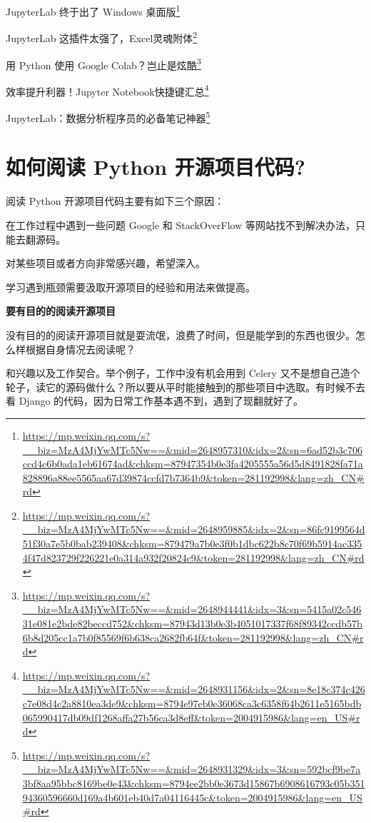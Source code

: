 \documentclass[]{ctexbook}
\renewcommand{\href}[2]{#2\footnote{\url{#1}}}
\begin{document}
\href{https://mp.weixin.qq.com/s?__biz=MzA4MjYwMTc5Nw==\&mid=2648957310\&idx=2\&sn=6ad52b3c706ccd4c6b0ada1eb61674ad\&chksm=87947354b0e3fa4205555a56d5d8491828fa71a828896a88ee5565aa67d39874ccfd7b7364b9\&token=281192998\&lang=zh_CN\#rd}{JupyterLab 终于出了 Windows 桌面版}

\href{https://mp.weixin.qq.com/s?__biz=MzA4MjYwMTc5Nw==\&mid=2648959885\&idx=2\&sn=86fc9199564d51f30a7e5b0bab239408\&chksm=879479a7b0e3f0b1dbc622b8c70f69b5914ac3354f47d823729f226221e0a314a932f20824c9\&token=281192998\&lang=zh_CN\#rd}{JupyterLab 这插件太强了，Excel灵魂附体}

\href{https://mp.weixin.qq.com/s?__biz=MzA4MjYwMTc5Nw==\&mid=2648944441\&idx=3\&sn=5415a02c54631e081e2bde82beccd752\&chksm=87943d13b0e3b4051017337f68f89342ccdb57b6b8d205cc1a7b0f85569f6b638ca2682fb64f\&token=281192998\&lang=zh_CN\#rd}{用 Python 使用 Google Colab？岂止是炫酷}

\href{https://mp.weixin.qq.com/s?__biz=MzA4MjYwMTc5Nw==\&mid=2648931156\&idx=2\&sn=8e18c374c426c7e08d4c2a8810ea3de9\&chksm=8794e97eb0e36068ca3c6358f64b2611e5165bdb065990417db09df1268affa27b56ca3d8eff\&token=2004915986\&lang=en_US\#rd}{效率提升利器！Jupyter Notebook快捷键汇总}

\href{https://mp.weixin.qq.com/s?__biz=MzA4MjYwMTc5Nw==\&mid=2648931329\&idx=3\&sn=592bcf9be7a3bf8aa95bbc8169be0e43\&chksm=8794ee2bb0e3673d15867b6908616793c05b35194360596660d169a4b601eb40d7a04116445c\&token=2004915986\&lang=en_US\#rd}{JupyterLab：数据分析程序员的必备笔记神器}

\hypertarget{ux5982ux4f55ux9605ux8bfb-python-ux5f00ux6e90ux9879ux76eeux4ee3ux7801}{%
\section{如何阅读 Python 开源项目代码?}\label{ux5982ux4f55ux9605ux8bfb-python-ux5f00ux6e90ux9879ux76eeux4ee3ux7801}}

阅读 Python 开源项目代码主要有如下三个原因：

在工作过程中遇到一些问题 Google 和 StackOverFlow 等网站找不到解决办法，只能去翻源码。

对某些项目或者方向非常感兴趣，希望深入。

学习遇到瓶颈需要汲取开源项目的经验和用法来做提高。

\textbf{要有目的的阅读开源项目}

没有目的的阅读开源项目就是耍流氓，浪费了时间，但是能学到的东西也很少。怎么样根据自身情况去阅读呢？

和兴趣以及工作契合。举个例子，工作中没有机会用到 Celery 又不是想自己造个轮子，读它的源码做什么？所以要从平时能接触到的那些项目中选取。有时候不去看 Django 的代码，因为日常工作基本遇不到，遇到了现翻就好了。
\end{document}
